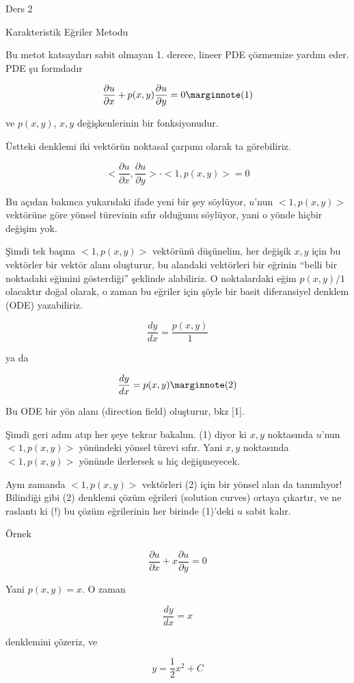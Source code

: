 \documentclass[12pt,fleqn]{article}\usepackage{../../common}
\begin{document}
Ders 2

Karakteristik Eğriler Metodu

Bu metot katsayıları sabit olmayan 1. derece, lineer PDE çözmemize yardım
eder. PDE şu formdadır

$$ \frac{\partial u}{\partial x} + 
p(x,y) \frac{\partial u}{\partial y} = 0 
\mlabel{1}
 $$

ve $p(x,y)$, $x,y$ değişkenlerinin bir fonksiyonudur. 

Üstteki denklemi iki vektörün noktasal çarpımı olarak ta görebiliriz. 

$$ 
<\frac{\partial u}{\partial x}, \frac{\partial u}{\partial y}> \cdot 
<1,p(x,y)> = 0
 $$

Bu açıdan bakınca yukarıdaki ifade yeni bir şey söylüyor, $u$'nun
$<1,p(x,y)>$ vektörüne göre yönsel türevinin sıfır olduğunu söylüyor, yani
o yönde hiçbir değişim yok. 

Şimdi tek başına $<1,p(x,y)>$ vektörünü düşünelim, her değişik $x,y$ için
bu vektörler bir vektör alanı oluşturur, bu alandaki vektörleri bir eğrinin
``belli bir noktadaki eğimini gösterdiği'' şeklinde alabiliriz. O
noktalardaki eğim $p(x,y) / 1$ olacaktır doğal olarak, o zaman bu eğriler
için şöyle bir basit diferansiyel denklem (ODE) yazabiliriz.

$$ \frac{dy}{dx} = \frac{p(x,y)}{1} $$

ya da

$$ \frac{dy}{dx} = p(x,y) 
\mlabel{2}
$$

Bu ODE bir yön alanı (direction field) oluşturur, bkz [1].

Şimdi geri adım atıp her şeye tekrar bakalım. (1) diyor ki $x,y$ noktasında
$u$'nun $<1,p(x,y)>$ yönündeki yönsel türevi sıfır. Yani $x,y$ noktasında
$<1,p(x,y)>$ yönünde ilerlersek $u$ hiç değişmeyecek. 

Aynı zamanda $<1,p(x,y)>$ vektörleri (2) için bir yönsel alan da
tanımlıyor!  Bilindiği gibi (2) denklemi çözüm eğrileri (solution curves)
ortaya çıkartır, ve ne raslantı ki (!) bu çözüm eğrilerinin her birinde
(1)'deki $u$ sabit kalır. 

Örnek 

$$ \frac{\partial u}{\partial x} + 
x \frac{\partial u}{\partial y} = 0 
 $$

Yani $p(x,y) = x$. O zaman 

$$ \frac{dy}{dx} = x $$

denklemini çözeriz, ve 

$$ y = \frac{1}{2}x^2 + C $$
\end{document}
